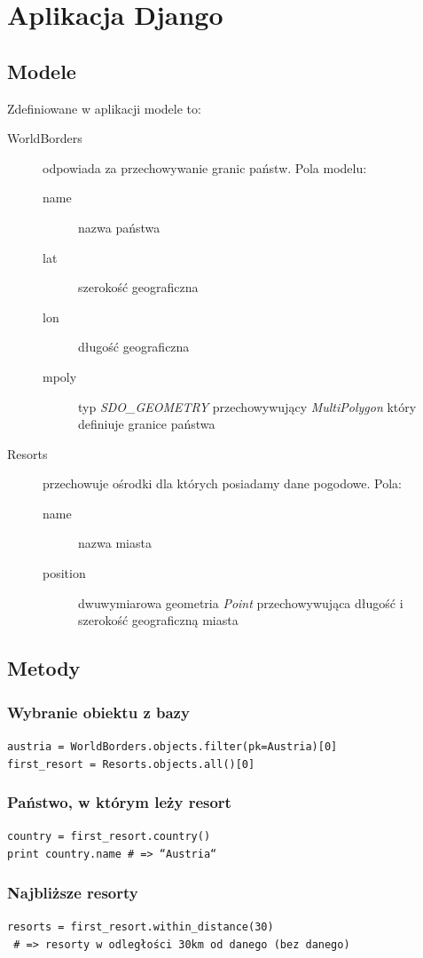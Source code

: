 \documentclass[12pt]{article}
\begin{document}
\section{Aplikacja Django}
\subsection{Modele}
Zdefiniowane w aplikacji modele to:
\begin{description}
\item[WorldBorders] odpowiada za przechowywanie granic państw. Pola modelu:
  \begin{description}
  \item[name] nazwa państwa
  \item[lat] szerokość geograficzna
  \item[lon] długość geograficzna
  \item[mpoly] typ \emph{SDO\_GEOMETRY} przechowywujący \emph{MultiPolygon} który
    definiuje granice państwa
  \end{description}
\item[Resorts] przechowuje ośrodki dla których posiadamy dane pogodowe. Pola:
  \begin{description}
    \item[name] nazwa miasta
    \item[position] dwuwymiarowa geometria \emph{Point} przechowywująca długość i
      szerokość geograficzną miasta
  \end{description}
\end{description}

\subsection{Metody}
\subsubsection{Wybranie obiektu z bazy}
\texttt{austria = WorldBorders.objects.filter(pk=Austria)[0]} \\
\texttt{first\_resort = Resorts.objects.all()[0]}

\subsubsection{Państwo, w którym leży resort}
\texttt{country = first\_resort.country()} \\
\texttt{print country.name \# => ``Austria``}

\subsubsection{Najbliższe resorty}
\texttt{resorts = first\_resort.within\_distance(30)} \\
\texttt{  \# => resorty w odległości 30km od danego (bez danego)}
\end{document}
